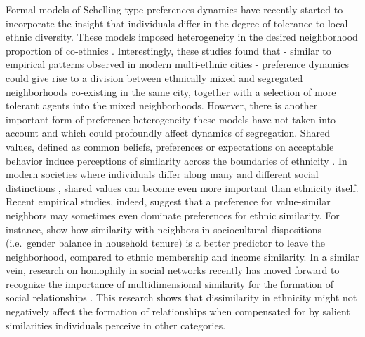\documentclass[
]{article}
\begin{document}
Formal models of Schelling-type preferences dynamics have recently
started to incorporate the insight that individuals differ in the degree
of tolerance to local ethnic diversity. These models imposed
heterogeneity in the desired neighborhood proportion of co-ethnics
\citep{xie2012modeling, hatna2014combining}. Interestingly, these
studies found that - similar to empirical patterns observed in modern
multi-ethnic cities - preference dynamics could give rise to a division
between ethnically mixed and segregated neighborhoods co-existing in the
same city, together with a selection of more tolerant agents into the
mixed neighborhoods. However, there is another important form of
preference heterogeneity these models have not taken into account and
which could profoundly affect dynamics of segregation. Shared values,
defined as common beliefs, preferences or expectations on acceptable
behavior induce perceptions of similarity across the boundaries of
ethnicity \citep{wimmer2013ethnic,bail2008configuration}. In modern
societies where individuals differ along many and different social
distinctions \citep{vertovec2007super}, shared values can become even
more important than ethnicity itself. Recent empirical studies, indeed,
suggest that a preference for value-similar neighbors may sometimes even
dominate preferences for ethnic similarity. For
instance,\cite{van2019sociocultural} show how similarity with neighbors
in sociocultural dispositions (i.e.~gender balance in household tenure)
is a better predictor to leave the neighborhood, compared to ethnic
membership and income similarity. In a similar vein, research on
homophily in social networks recently has moved forward to recognize the
importance of multidimensional similarity for the formation of social
relationships
\citep{block2014multidimensional,hooijsma2020multidimensional}. This
research shows that dissimilarity in ethnicity might not negatively
affect the formation of relationships when compensated for by salient
similarities individuals perceive in other categories.
\end{document}
